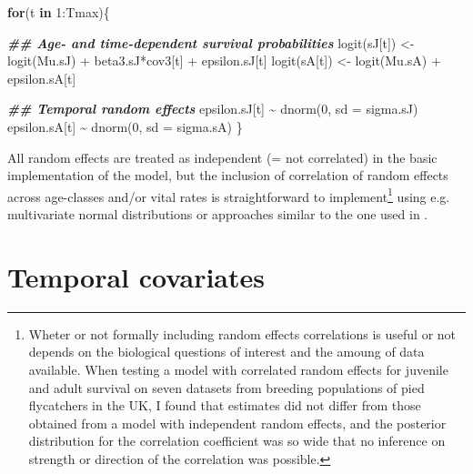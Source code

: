 \documentclass[
]{book}
\newenvironment{Shaded}{\begin{snugshade}}{\end{snugshade}}
\newcommand{\AttributeTok}[1]{\textcolor[rgb]{0.77,0.63,0.00}{#1}}
\newcommand{\ControlFlowTok}[1]{\textcolor[rgb]{0.13,0.29,0.53}{\textbf{#1}}}
\newcommand{\DecValTok}[1]{\textcolor[rgb]{0.00,0.00,0.81}{#1}}
\newcommand{\DocumentationTok}[1]{\textcolor[rgb]{0.56,0.35,0.01}{\textbf{\textit{#1}}}}
\newcommand{\FunctionTok}[1]{\textcolor[rgb]{0.00,0.00,0.00}{#1}}
\newcommand{\NormalTok}[1]{#1}
\newcommand{\OtherTok}[1]{\textcolor[rgb]{0.56,0.35,0.01}{#1}}
\newcommand{\SpecialCharTok}[1]{\textcolor[rgb]{0.00,0.00,0.00}{#1}}
\begin{document}
\begin{Shaded}
\begin{Highlighting}[]
\ControlFlowTok{for}\NormalTok{(t }\ControlFlowTok{in} \DecValTok{1}\SpecialCharTok{:}\NormalTok{Tmax)\{}
    
  \DocumentationTok{\#\# Age{-} and time{-}dependent survival probabilities}
  \FunctionTok{logit}\NormalTok{(sJ[t]) }\OtherTok{\textless{}{-}} \FunctionTok{logit}\NormalTok{(Mu.sJ) }\SpecialCharTok{+}\NormalTok{ beta3.sJ}\SpecialCharTok{*}\NormalTok{cov3[t] }\SpecialCharTok{+}\NormalTok{ epsilon.sJ[t]}
  \FunctionTok{logit}\NormalTok{(sA[t]) }\OtherTok{\textless{}{-}} \FunctionTok{logit}\NormalTok{(Mu.sA) }\SpecialCharTok{+}\NormalTok{ epsilon.sA[t]}

  \DocumentationTok{\#\# Temporal random effects}
\NormalTok{    epsilon.sJ[t] }\SpecialCharTok{\textasciitilde{}} \FunctionTok{dnorm}\NormalTok{(}\DecValTok{0}\NormalTok{, }\AttributeTok{sd =}\NormalTok{ sigma.sJ)}
\NormalTok{    epsilon.sA[t] }\SpecialCharTok{\textasciitilde{}} \FunctionTok{dnorm}\NormalTok{(}\DecValTok{0}\NormalTok{, }\AttributeTok{sd =}\NormalTok{ sigma.sA)}
\NormalTok{\}}
\end{Highlighting}
\end{Shaded}

All random effects are treated as independent (= not correlated) in the basic
implementation of the model, but the inclusion of correlation of random effects
across age-classes and/or vital rates is straightforward to implement\footnote{Wheter or
  not formally including random effects correlations is useful or not depends on
  the biological questions of interest and the amoung of data available. When
  testing a model with correlated random effects for juvenile and adult survival
  on seven datasets from breeding populations of pied flycatchers in the UK, I
  found that estimates did not differ from those obtained from a model with
  independent random effects, and the posterior distribution for the correlation
  coefficient was so wide that no inference on strength or direction of the
  correlation was possible.} using e.g.
multivariate normal distributions or approaches similar to the one used in
\citet{nater2020}.

\hypertarget{temporal-covariates}{%
\section{Temporal covariates}\label{temporal-covariates}}
\end{document}
